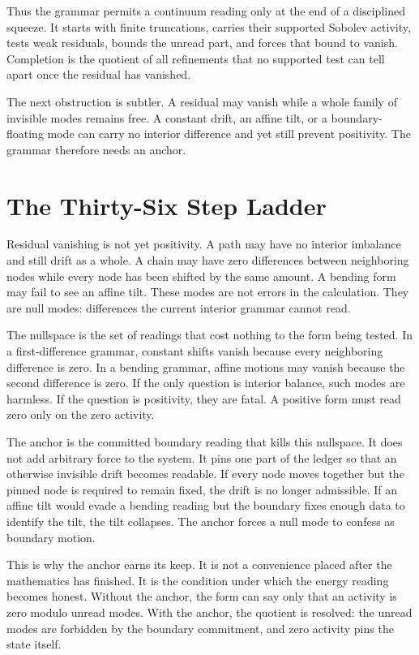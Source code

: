 Thus the grammar permits a continuum reading only at the end of a disciplined
squeeze. It starts with finite truncations, carries their supported
Sobolev activity, tests weak residuals, bounds the unread part, and forces
that bound to vanish. Completion is the quotient of all refinements that no
supported test can tell apart once the residual has vanished.

The next obstruction is subtler. A residual may vanish while a whole family
of invisible modes remains free. A constant drift, an affine tilt, or a
boundary-floating mode can carry no interior difference and yet still
prevent positivity. The grammar therefore needs an anchor.

\section{The Thirty-Six Step Ladder}

Residual vanishing is not yet positivity. A path may have no interior
imbalance and still drift as a whole. A chain may have zero differences
between neighboring nodes while every node has been shifted by the same
amount. A bending form may fail to see an affine tilt. These modes are not
errors in the calculation. They are null modes: differences the current
interior grammar cannot read.

The nullspace is the set of readings that cost nothing to the form being
tested. In a first-difference grammar, constant shifts vanish because every
neighboring difference is zero. In a bending grammar, affine motions may
vanish because the second difference is zero. If the only question is
interior balance, such modes are harmless. If the question is positivity,
they are fatal. A positive form must read zero only on the zero activity.

The anchor is the committed boundary reading that kills this nullspace. It
does not add arbitrary force to the system. It pins one part of the ledger
so that an otherwise invisible drift becomes readable. If every node moves
together but the pinned node is required to remain fixed, the drift is no
longer admissible. If an affine tilt would evade a bending reading but the
boundary fixes enough data to identify the tilt, the tilt collapses. The
anchor forces a null mode to confess as boundary motion.

This is why the anchor earns its keep. It is not a convenience placed after
the mathematics has finished. It is the condition under which the energy
reading becomes honest. Without the anchor, the form can say only that an
activity is zero modulo unread modes. With the anchor, the quotient is
resolved: the unread modes are forbidden by the boundary commitment, and
zero activity pins the state itself.

